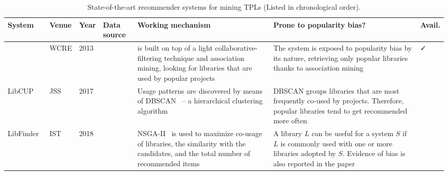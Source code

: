 \begin{table*}[t!]
	\centering
	\scriptsize
	\caption{State-of-the-art recommender systems for mining TPLs (Listed in chronological order).}
	\begin{tabular}{|p{1.40cm} | p{1.1cm} | p{0.4cm} | p{1.50cm} | p{4.4cm} |p{4.4cm} | p{0.45cm} |}	\hline
		\textbf{System} & \textbf{Venue} & \textbf{Year} & \textbf{Data source} & \textbf{Working mechanism} & \textbf{Prone to popularity bias?} & \textbf{Avail.}  \\ \hline
		\LR~\cite{6671293} & WCRE & 2013 & \GH & \LR is built on top of a light collaborative-filtering technique and association mining, looking for libraries that are used by popular projects & The system is exposed to popularity bias by its nature, retrieving only popular libraries thanks to association mining~\cite{10.1145/170035.170072} & \cellcolor{lightgray}\faCheck  \\ \hline
		LibCUP~\cite{SAIED2018164} & JSS & 2017 & \GH  & Usage patterns are discovered by means of DBSCAN~\cite{10.5555/3001460.3001507} -- a hierarchical clustering algorithm & DBSCAN groups libraries that are most frequently co-used by projects. Therefore, popular libraries tend to get recommended more often  & \untick  \\ \hline
		LibFinder~\cite{Ouni:2017:SSL:3032135.3032325} & IST & 2018 & \GH & NSGA-II~\cite{DBLP:journals/tec/DebAPM02} is used to maximize co-usage of libraries, the similarity with the candidates, and the total number of recommended items & %
		A library $L$ can be useful for a system $S$ if $L$ is commonly used with one or more libraries adopted by $S$. Evidence of bias is also reported in the paper & \untick \\ \hline
		
		

\end{tabular}
\end{table*}
